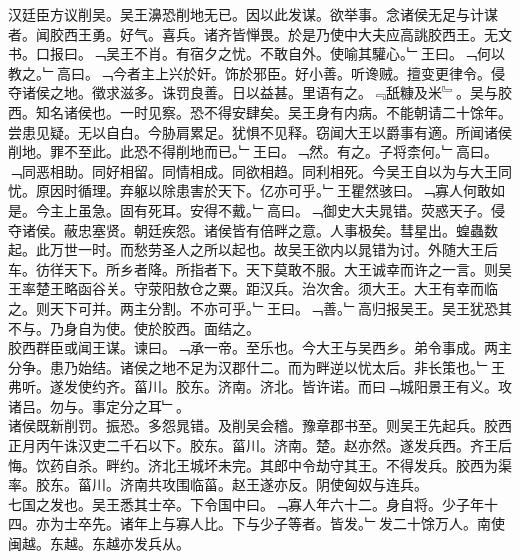 \documentclass{zhvt-classic}
\begin{document}
\hspace*{2em}汉廷臣方议削吴。吴王濞恐削地无已。因以此发谋。欲举事。念诸侯无足与计谋者。闻胶西王勇。好气。喜兵。诸齐皆惮畏。於是乃使中大夫应高誂胶西王。无文书。口报曰。﹁吴王不肖。有宿夕之忧。不敢自外。使喻其驩心。﹂王曰。﹁何以教之。﹂高曰。﹁今者主上兴於奸。饰於邪臣。好小善。听谗贼。擅变更律令。侵夺诸侯之地。徵求滋多。诛罚良善。日以益甚。里语有之。﹃舐糠及米﹄。吴与胶西。知名诸侯也。一时见察。恐不得安肆矣。吴王身有内病。不能朝请二十馀年。尝患见疑。无以自白。今胁肩累足。犹惧不见释。窃闻大王以爵事有適。所闻诸侯削地。罪不至此。此恐不得削地而已。﹂王曰。﹁然。有之。子将柰何。﹂高曰。﹁同恶相助。同好相留。同情相成。同欲相趋。同利相死。今吴王自以为与大王同忧。原因时循理。弃躯以除患害於天下。亿亦可乎。﹂王瞿然骇曰。﹁寡人何敢如是。今主上虽急。固有死耳。安得不戴。﹂高曰。﹁御史大夫晁错。荧惑天子。侵夺诸侯。蔽忠塞贤。朝廷疾怨。诸侯皆有倍畔之意。人事极矣。彗星出。蝗蟲数起。此万世一时。而愁劳圣人之所以起也。故吴王欲内以晁错为讨。外随大王后车。彷徉天下。所乡者降。所指者下。天下莫敢不服。大王诚幸而许之一言。则吴王率楚王略函谷关。守荥阳敖仓之粟。距汉兵。治次舍。须大王。大王有幸而临之。则天下可并。两主分割。不亦可乎。﹂王曰。﹁善。﹂高归报吴王。吴王犹恐其不与。乃身自为使。使於胶西。面结之。\\
\hspace*{2em}胶西群臣或闻王谋。谏曰。﹁承一帝。至乐也。今大王与吴西乡。弟令事成。两主分争。患乃始结。诸侯之地不足为汉郡什二。而为畔逆以忧太后。非长策也。﹂王弗听。遂发使约齐。菑川。胶东。济南。济北。皆许诺。而曰﹁城阳景王有义。攻诸吕。勿与。事定分之耳﹂。\\
\hspace*{2em}诸侯既新削罚。振恐。多怨晁错。及削吴会稽。豫章郡书至。则吴王先起兵。胶西正月丙午诛汉吏二千石以下。胶东。菑川。济南。楚。赵亦然。遂发兵西。齐王后悔。饮药自杀。畔约。济北王城坏未完。其郎中令劫守其王。不得发兵。胶西为渠率。胶东。菑川。济南共攻围临菑。赵王遂亦反。阴使匈奴与连兵。\\
\hspace*{2em}七国之发也。吴王悉其士卒。下令国中曰。﹁寡人年六十二。身自将。少子年十四。亦为士卒先。诸年上与寡人比。下与少子等者。皆发。﹂发二十馀万人。南使闽越。东越。东越亦发兵从。\\
\end{document}
